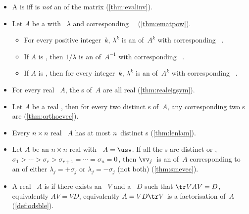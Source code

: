 \begin{itemize}
\item A  is  iff  is \emph{not} an  of the matrix (\autoref{thm:evalinv}).

\item Let \(A\) be a  with ~\(\lambda\) and corresponding ~\xv\ (\autoref{thm:ematpow}).
\begin{itemize}
\item For every positive integer~\(k\), \(\lambda^k\) is an  of~\(A^k\) with corresponding ~\xv.
\item If \(A\) is , then \(1/\lambda\) is an  of~\(A^{-1}\) with corresponding ~\xv.
\item If \(A\) is , then for every integer~\(k\), \(\lambda^k\) is an  of~\(A^k\) with corresponding ~\xv.
\end{itemize}

\item For every real ~\(A\), the s of~\(A\) are all real (\autoref{thm:realeigsym}).

\item Let \(A\) be a real , then for every two distinct s of~\(A\), any corresponding two s are  (\autoref{thm:orthoevec}).

\item Every \(n\times n\) real ~\(A\) has at most \(n\)~distinct s (\autoref{thm:lenlam}).

\item Let \(A\) be an \(n\times n\) real  with \svd\ \(A=\usv\).
If all the s are distinct or , \(\sigma_1>\cdots>\sigma_r>\sigma_{r+1}=\cdots=\sigma_n=0\)\,, then \(\vv_j\)~is an  of~\(A\) corresponding to an  of either \(\lambda_j=+\sigma_j\) or \(\lambda_j=-\sigma_j\) (not both)  (\autoref{thm:smevec}).

\item A real ~\(A\) is  if there exists an ~\(V\) and a ~\(D\) such that \(\tr VAV=D\), equivalently \(AV=VD\), equivalently \(A=VD\tr V\) is a factorisation of~\(A\) (\autoref{def:odsble}).


\end{itemize}
